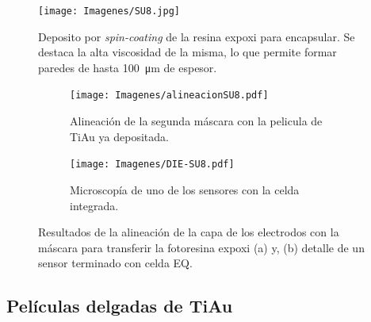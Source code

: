  				\begin{figure}[ht!]
 				\centering
 				\texttt{[image: Imagenes/SU8.jpg]}
 				\caption[Deposito de la resina expoxi SU8]{Deposito por \textit{spin-coating }de la resina expoxi para encapsular. Se destaca la alta viscosidad de la misma, lo que permite formar paredes de hasta \SI{100}{\um} de espesor.}
 				\label{fig:su8}
 				\end{figure}

 				\begin{figure}[th]
			 	   	    \centering
			 	   	    \begin{subfigure}[t]{0.495\textwidth}
			        	\texttt{[image: Imagenes/alineacionSU8.pdf]}
			       		\caption{Alineación de la segunda máscara con la pelicula de Ti\textbar Au ya depositada.}
			         	\label{fig:alineacion}
			     		\end{subfigure}
			     		\begin{subfigure}[t]{0.495\textwidth}
			     		\texttt{[image: Imagenes/DIE-SU8.pdf]}
			    		\caption{Microscopía de uno de los sensores con la celda integrada.}
			     		\label{fig:die-su8}	
						\end{subfigure}
						\caption[Alineación y celda integrada en SU8]{Resultados de la alineación de la capa de los electrodos con la máscara para transferir la fotoresina expoxi (a) y, (b) detalle de un sensor terminado con celda EQ.}
			     		\label{fig:resultados-su8}
			     	   	\end{figure}

 		\subsection{Películas delgadas de Ti\textbar Au}

